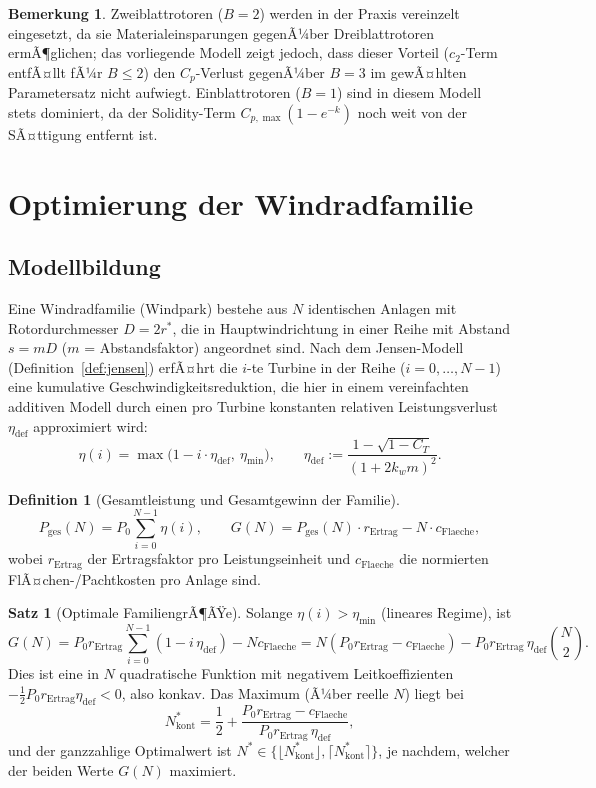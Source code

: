 ﻿\documentclass[a4paper,12pt]{article}
\theoremstyle{definition}
\newtheorem{definition}{Definition}
\newtheorem{satz}{Satz}
\newtheorem{bemerkung}{Bemerkung}
\begin{document}
\begin{bemerkung}
Zweiblattrotoren ($B=2$) werden in der Praxis vereinzelt eingesetzt, da sie Materialeinsparungen gegenÃ¼ber Dreiblattrotoren ermÃ¶glichen; das vorliegende Modell zeigt jedoch, dass dieser Vorteil ($c_2$-Term entfÃ¤llt fÃ¼r $B\le2$) den $C_p$-Verlust gegenÃ¼ber $B=3$ im gewÃ¤hlten Parametersatz nicht aufwiegt. Einblattrotoren ($B=1$) sind in diesem Modell stets dominiert, da der Solidity-Term $C_{p,\max}(1-e^{-k})$ noch weit von der SÃ¤ttigung entfernt ist.
\end{bemerkung}

\section{Optimierung der Windradfamilie}

\subsection{Modellbildung}

Eine Windradfamilie (Windpark) bestehe aus $N$ identischen Anlagen mit Rotordurchmesser $D=2r^*$, die in Hauptwindrichtung in einer Reihe mit Abstand $s=mD$ ($m$ = Abstandsfaktor) angeordnet sind. Nach dem Jensen-Modell (Definition~\ref{def:jensen}) erfÃ¤hrt die $i$-te Turbine in der Reihe ($i=0,\ldots,N-1$) eine kumulative Geschwindigkeitsreduktion, die hier in einem vereinfachten additiven Modell durch einen pro Turbine konstanten relativen Leistungsverlust $\eta_{\mathrm{def}}$ approximiert wird:
\[
\eta(i) = \max\bigl(1 - i\cdot\eta_{\mathrm{def}},\ \eta_{\min}\bigr), \qquad \eta_{\mathrm{def}} := \frac{1-\sqrt{1-C_T}}{(1+2k_w m)^2}.
\]

\begin{definition}[Gesamtleistung und Gesamtgewinn der Familie]
\[
P_{\mathrm{ges}}(N) = P_0 \sum_{i=0}^{N-1}\eta(i), \qquad
G(N) = P_{\mathrm{ges}}(N)\cdot r_{\mathrm{Ertrag}} - N\cdot c_{\mathrm{Flaeche}},
\]
wobei $r_{\mathrm{Ertrag}}$ der Ertragsfaktor pro Leistungseinheit und $c_{\mathrm{Flaeche}}$ die normierten FlÃ¤chen-/Pachtkosten pro Anlage sind.
\end{definition}

\begin{satz}[Optimale FamiliengrÃ¶ÃŸe]
\label{satz:familie}
Solange $\eta(i) > \eta_{\min}$ (lineares Regime), ist
\[
G(N) = P_0 r_{\mathrm{Ertrag}}\sum_{i=0}^{N-1}\left(1-i\,\eta_{\mathrm{def}}\right) - N c_{\mathrm{Flaeche}}
= N\left(P_0 r_{\mathrm{Ertrag}} - c_{\mathrm{Flaeche}}\right) - P_0 r_{\mathrm{Ertrag}}\,\eta_{\mathrm{def}}\binom{N}{2}.
\]
Dies ist eine in $N$ quadratische Funktion mit negativem Leitkoeffizienten $-\tfrac{1}{2}P_0 r_{\mathrm{Ertrag}}\eta_{\mathrm{def}}<0$, also konkav. Das Maximum (Ã¼ber reelle $N$) liegt bei
\[
N_{\mathrm{kont}}^* = \frac{1}{2} + \frac{P_0 r_{\mathrm{Ertrag}} - c_{\mathrm{Flaeche}}}{P_0 r_{\mathrm{Ertrag}}\,\eta_{\mathrm{def}}},
\]
und der ganzzahlige Optimalwert ist $N^* \in \{\lfloor N_{\mathrm{kont}}^*\rfloor, \lceil N_{\mathrm{kont}}^*\rceil\}$, je nachdem, welcher der beiden Werte $G(N)$ maximiert.
\end{satz}
\end{document}
